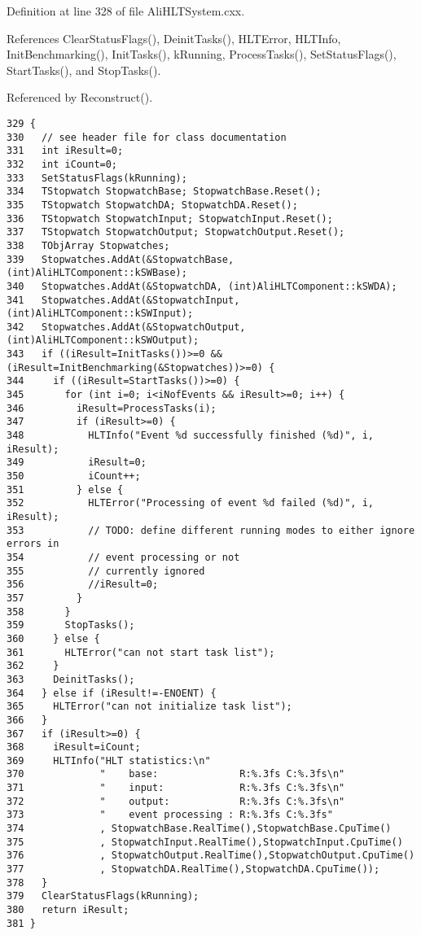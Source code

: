 Definition at line 328 of file Ali\-HLTSystem.cxx.

References Clear\-Status\-Flags(), Deinit\-Tasks(), HLTError, HLTInfo, Init\-Benchmarking(), Init\-Tasks(), k\-Running, Process\-Tasks(), Set\-Status\-Flags(), Start\-Tasks(), and Stop\-Tasks().

Referenced by Reconstruct().

\footnotesize\begin{verbatim}329 {
330   // see header file for class documentation
331   int iResult=0;
332   int iCount=0;
333   SetStatusFlags(kRunning);
334   TStopwatch StopwatchBase; StopwatchBase.Reset();
335   TStopwatch StopwatchDA; StopwatchDA.Reset();
336   TStopwatch StopwatchInput; StopwatchInput.Reset();
337   TStopwatch StopwatchOutput; StopwatchOutput.Reset();
338   TObjArray Stopwatches;
339   Stopwatches.AddAt(&StopwatchBase, (int)AliHLTComponent::kSWBase);
340   Stopwatches.AddAt(&StopwatchDA, (int)AliHLTComponent::kSWDA);
341   Stopwatches.AddAt(&StopwatchInput, (int)AliHLTComponent::kSWInput);
342   Stopwatches.AddAt(&StopwatchOutput, (int)AliHLTComponent::kSWOutput);
343   if ((iResult=InitTasks())>=0 && (iResult=InitBenchmarking(&Stopwatches))>=0) {
344     if ((iResult=StartTasks())>=0) {
345       for (int i=0; i<iNofEvents && iResult>=0; i++) {
346         iResult=ProcessTasks(i);
347         if (iResult>=0) {
348           HLTInfo("Event %d successfully finished (%d)", i, iResult);
349           iResult=0;
350           iCount++;
351         } else {
352           HLTError("Processing of event %d failed (%d)", i, iResult);
353           // TODO: define different running modes to either ignore errors in
354           // event processing or not
355           // currently ignored 
356           //iResult=0;
357         }
358       }
359       StopTasks();
360     } else {
361       HLTError("can not start task list");
362     }
363     DeinitTasks();
364   } else if (iResult!=-ENOENT) {
365     HLTError("can not initialize task list");
366   }
367   if (iResult>=0) {
368     iResult=iCount;
369     HLTInfo("HLT statistics:\n"
370             "    base:              R:%.3fs C:%.3fs\n"
371             "    input:             R:%.3fs C:%.3fs\n"
372             "    output:            R:%.3fs C:%.3fs\n"
373             "    event processing : R:%.3fs C:%.3fs"
374             , StopwatchBase.RealTime(),StopwatchBase.CpuTime()
375             , StopwatchInput.RealTime(),StopwatchInput.CpuTime()
376             , StopwatchOutput.RealTime(),StopwatchOutput.CpuTime()
377             , StopwatchDA.RealTime(),StopwatchDA.CpuTime());
378   }
379   ClearStatusFlags(kRunning);
380   return iResult;
381 }
\end{verbatim}\normalsize 


